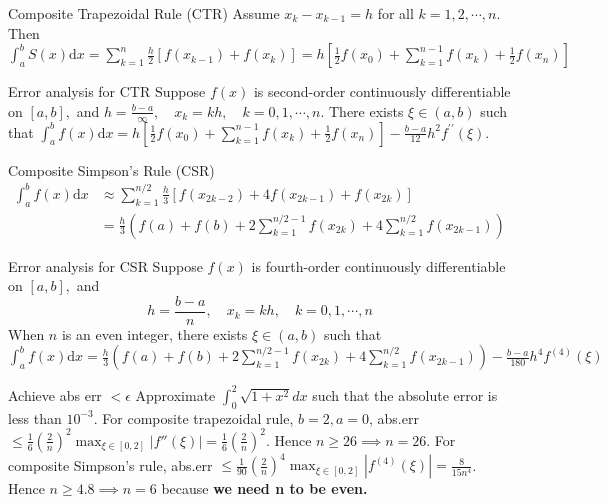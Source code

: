 \documentclass[10pt,landscape]{article}
\theoremstyle{definition}
\newcommand{\thistheoremname}{}
\newtheorem*{genericthm*}{\thistheoremname}
\newenvironment{namedthm*}[1]
{\renewcommand{\thistheoremname}{#1}\begin{genericthm*}}
{\end{genericthm*}}
\begin{document}
\begin{multicols}{3}
	\begin{namedthm*}{Composite Trapezoidal Rule (CTR)} Assume \(x_{k}-x_{k-1}=h\) for all \(k=1,2, \cdots, n\). Then
		\(\int_{a}^{b} S(x) \mathrm{d} x=\sum_{k=1}^{n} \frac{h}{2}\left[f\left(x_{k-1}\right)+f\left(x_{k}\right)\right]=h\left[\frac{1}{2} f\left(x_{0}\right)+\sum_{k=1}^{n-1} f\left(x_{k}\right)+\frac{1}{2} f\left(x_{n}\right)\right]\)
	\end{namedthm*}

	\begin{namedthm*}{Error analysis for CTR}
		Suppose \(f(x)\) is second-order continuously differentiable on \([a, b],\) and
		\(
		h=\frac{b-a}{\infty}, \quad x_{k}=k h, \quad k=0,1, \cdots, n
		\). There exists \(\xi \in(a, b)\) such that \(\int_{a}^{b} f(x) \mathrm{d} x=h\left[\frac{1}{2} f\left(x_{0}\right)+\sum_{k=1}^{n-1} f\left(x_{k}\right)+\frac{1}{2} f\left(x_{n}\right)\right]-\frac{b-a}{12} h^{2} f^{\prime \prime}(\xi)\).
	\end{namedthm*}
	\begin{namedthm*}{Composite Simpson's Rule (CSR)}
		\(\begin{aligned} \int_{a}^{b} f(x) \mathrm{d} x & \approx \sum_{k=1}^{n / 2} \frac{h}{3}\left[f\left(x_{2 k-2}\right)+4 f\left(x_{2 k-1}\right)+f\left(x_{2 k}\right)\right] \\ &=\frac{h}{3}\left(f(a)+f(b)+2 \sum_{k=1}^{n / 2-1} f\left(x_{2 k}\right)+4 \sum_{k=1}^{n / 2} f\left(x_{2 k-1}\right)\right) \end{aligned}\)
	\end{namedthm*}
	\begin{namedthm*}{Error analysis for CSR}
		Suppose \(f(x)\) is fourth-order continuously differentiable on \([a, b],\) and
		\[
			h=\frac{b-a}{n}, \quad x_{k}=k h, \quad k=0,1, \cdots, n
		\]When \(n\) is an even integer, there exists \(\xi \in(a, b)\) such that
		\(
		\int_{a}^{b} f(x) \mathrm{d} x=\frac{h}{3}\left(f(a)+f(b)+2 \sum_{k=1}^{n / 2-1} f\left(x_{2 k}\right)+4 \sum_{k=1}^{n / 2} f\left(x_{2 k-1}\right)\right)-\frac{b-a}{180} h^{4} f^{(4)}(\xi)
		\)
	\end{namedthm*}
	\begin{namedthm*}{Achieve abs err \(< \epsilon\)}
		Approximate \(\int_0^2\sqrt{1+x^2}dx\) such that the absolute error is less than \(10^{-3}\).
		For composite trapezoidal rule, \(b=2,a=0\), abs.err \(\leq \frac{1}{6}(\frac{2}{n})^2\max_{\xi \in [0,2]}|f''(\xi)| = \frac{1}{6}(\frac{2}{n})^2\). Hence \(n\geq 26 \implies n= 26.\) For composite Simpson's rule,  abs.err \(\leq \frac{1}{90}(\frac{2}{n})^4\max_{\xi \in [0,2]}|f^{(4)}(\xi)| = \frac{8}{15n^4}\). Hence \(n\geq 4.8 \implies n=6\) because \textbf{we need n to be even.}
	\end{namedthm*}

\end{multicols}
\end{document}
